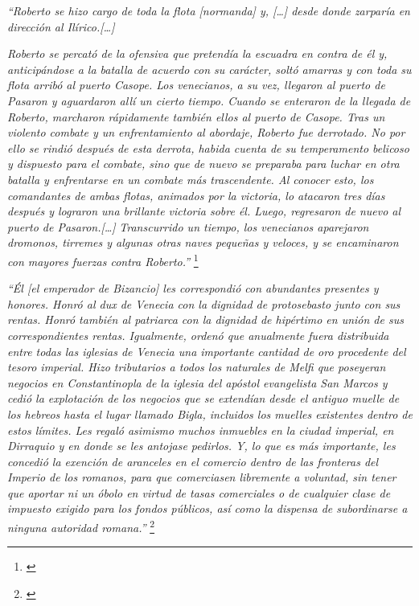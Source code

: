 \textit{“Roberto se hizo cargo de toda la flota [normanda] y, 
[…] desde donde zarparía en dirección al Ilírico.[…]}

\textit{Roberto se percató de la ofensiva que pretendía la escuadra en contra 
de él y, anticipándose a la batalla de acuerdo con su carácter, soltó 
amarras y con toda su flota arribó al puerto Casope. Los venecianos, 
a su vez, llegaron al puerto de Pasaron y aguardaron allí un cierto 
tiempo. Cuando se enteraron de la llegada de Roberto, marcharon 
rápidamente también ellos al puerto de Casope. Tras un violento 
combate y un enfrentamiento al abordaje, Roberto fue derrotado. 
No por ello se rindió después de esta derrota, habida cuenta de su 
temperamento belicoso y dispuesto para el combate, sino que de nuevo 
se preparaba para luchar en otra batalla y enfrentarse en un 
combate más trascendente. Al conocer esto, los comandantes de ambas 
flotas, animados por la victoria, lo atacaron tres días después y 
lograron una brillante victoria sobre él. Luego, regresaron de 
nuevo al puerto de Pasaron.[…]
}
\textit{Transcurrido un tiempo, los venecianos aparejaron dromonos, 
tirremes y algunas otras naves pequeñas y veloces, y se 
encaminaron con mayores fuerzas contra Roberto.”
}\footnote{\cite[pp.~250--252]{alexiadaVI}}

\textit{“Él [el emperador de Bizancio] les correspondió con 
abundantes presentes y honores.
Honró al dux de Venecia con la dignidad de protosebasto junto con 
sus rentas. Honró también al patriarca con la dignidad de hipértimo en 
unión de sus correspondientes rentas. Igualmente, ordenó que anualmente 
fuera distribuida entre todas las iglesias de Venecia una importante 
cantidad de oro procedente del tesoro imperial. Hizo tributarios a todos los 
naturales de Melfi que poseyeran negocios en Constantinopla de la 
iglesia del apóstol evangelista San Marcos y cedió la explotación de 
los negocios que se extendían desde el antiguo muelle de los hebreos 
hasta el lugar llamado Bigla, incluidos los muelles existentes dentro 
de estos límites. Les regaló asimismo muchos inmuebles en la ciudad 
imperial, en Dirraquio y en donde se les antojase pedirlos. Y, lo que 
es más importante, les concedió la exención de aranceles en el comercio 
dentro de las fronteras del Imperio de los romanos, para que comerciasen 
libremente a voluntad, sin tener que aportar ni un óbolo en virtud de tasas 
comerciales o de cualquier clase de impuesto exigido para los fondos 
públicos, así como la dispensa de subordinarse a ninguna autoridad romana.”
}\footnote{\cite[p.~252]{alexiadaVI}}

